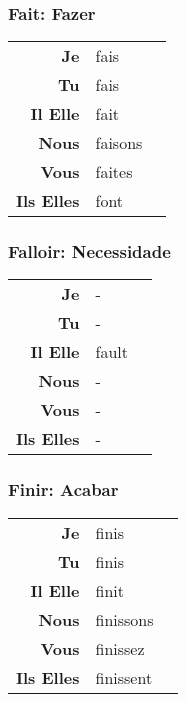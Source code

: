 \documentclass{subfiles}
\begin{document}
\begin{multicols}{3}
        \subsubsection{Fait: Fazer}
            \begin{tabular}{r l r}
                \textbf{Je}        & fais    &\\
                \textbf{Tu}        & fais    &\\
                \textbf{Il Elle}   & fait    &\\
                \textbf{Nous}      & faisons &\\
                \textbf{Vous}      & faites  &\\
                \textbf{Ils Elles} & font    &
            \end{tabular}

        \subsubsection{Falloir: Necessidade}
            \begin{tabular}{r l r}
                \textbf{Je}        &   -   &\\
                \textbf{Tu}        &   -   &\\
                \textbf{Il Elle}   & fault &\\
                \textbf{Nous}      &   -   &\\
                \textbf{Vous}      &   -   &\\
                \textbf{Ils Elles} &   -   &
            \end{tabular}

        \subsubsection{Finir: Acabar}
            \begin{tabular}{r l r}
                \textbf{Je}        & finis     &\\
                \textbf{Tu}        & finis     &\\
                \textbf{Il Elle}   & finit     &\\
                \textbf{Nous}      & finissons &\\
                \textbf{Vous}      & finissez  &\\
                \textbf{Ils Elles} & finissent &
            \end{tabular}


\end{multicols}
\end{document}
